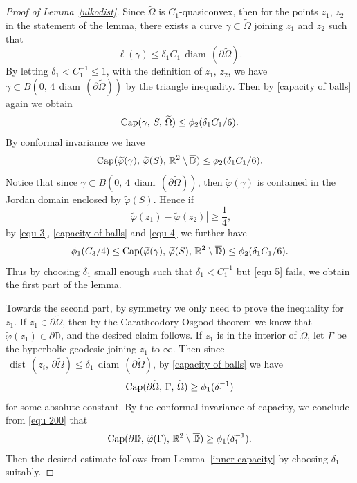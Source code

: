 \documentclass[reqno,11pt]{amsart}
\def\dist{{\mathop\mathrm{\,dist\,}}}
\def\wz{\widetilde}
\def\diam{{\mathop\mathrm{\,diam\,}}}
\numberwithin{equation}{section}
\theoremstyle{remark}
\begin{document}
\begin{proof}[Proof of Lemma~\ref{ulkodist}]
Since $\wz \Omega$ is $C_1$-quasiconvex, then for the points $z_1,\,z_2$ in the statement of the lemma, 
 there exists a curve $\gamma\subset \wz \Omega$ joining $z_1$ and $z_2$ such that
$$\ell(\gamma)\le \delta_1 C_1   \diam(\partial \wz  \Omega). $$
By letting $\delta_1<C_1^{-1}\le 1$, with the definition of $z_1,\,z_2$, we have $\gamma\subset B(0,\,4 \diam(\partial \wz  \Omega))$ by the triangle inequality. Then by \eqref{capacity of balls} again we obtain
\begin{equation}\label{equ 1}
{\rm Cap}(\gamma,\,S,\,\wz \Omega)\le \phi_2(\delta_1 C_1/6).
\end{equation}
By conformal invariance we have
\begin{equation}\label{equ 4}
{\rm Cap}(\wz \varphi (\gamma) ,\,\wz \varphi (S),\, \mathbb R^2\setminus \overline{\mathbb  D})\le \phi_2(\delta_1 C_1/6). 
\end{equation}
Notice that  since $\gamma\subset B(0,\, 4 \diam(\partial \wz  \Omega))$, then 
$\wz \varphi (\gamma)$ is contained in the Jordan domain enclosed by $\wz \varphi (S)$. 
Hence if 
$$|\wz \varphi (z_1)-\wz \varphi (z_2)|\ge \frac 1 4, $$
by \eqref{equ 3}, \eqref{capacity of balls} and \eqref{equ 4} we further have
\begin{equation}\label{equ 5}
 \phi_1(C_3/4)\le {\rm Cap}(\wz \varphi (\gamma) ,\,\wz \varphi (S),\, \mathbb R^2\setminus \overline{\mathbb  D}) \le \phi_2(\delta_1 C_1/6). 
\end{equation}
Thus by choosing $\delta_1$ small enough such that $\delta_1< C_1^{-1}$ but \eqref{equ 5} fails, we obtain the first part of the lemma. 

Towards the second part, by symmetry we only need to prove the inequality for $z_1$. If $z_1\in \partial \wz \Omega$, then by the 
Caratheodory-Osgood 
theorem we know that $\wz \varphi(z_1)\in \partial \mathbb D$, and the desired claim follows. If $z_1$ is in the interior of $\wz \Omega$, let $\Gamma$ be the hyperbolic geodesic joining $z_1$ to $\infty$. Then since $\dist(z_i,\,\partial \wz  \Omega)\le \delta_1 \diam(\partial \wz  \Omega)$,   by \eqref{capacity of balls}  we have
\begin{equation}\label{equ 200}
{\rm Cap}( \partial \wz \Omega,\,\Gamma,\,\wz \Omega)\ge \phi_1(\delta_1^{-1})
\end{equation}
for some absolute constant. 
By the conformal invariance of capacity, we conclude from \eqref{equ 200} that
\begin{equation*}
{\rm Cap}( \partial \mathbb D,\,\wz \varphi(\Gamma),\, \mathbb R^2\setminus \overline{\mathbb  D})\ge \phi_1(\delta_1^{-1}).
\end{equation*}
Then the desired estimate follows from Lemma~\ref{inner capacity} by choosing $\delta_1$ suitably.
\end{proof}
\end{document}
